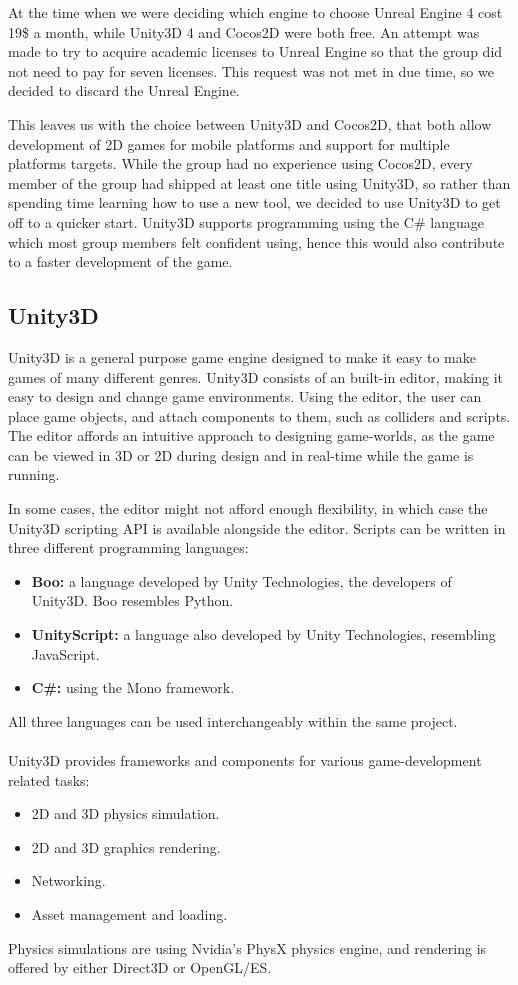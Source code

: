 At the time when we were deciding which engine to choose Unreal Engine 4 cost 19\$ a month\cite{unrealFree}, while Unity3D 4 and Cocos2D were both free. 
An attempt was made to try to acquire academic licenses to Unreal Engine so that the group did not need to pay for seven licenses. 
This request was not met in due time, so we decided to discard the Unreal Engine.

This leaves us with the choice between Unity3D and Cocos2D, that both allow development of 2D games for mobile platforms and support for multiple platforms targets.
While the group had no experience using Cocos2D, every member of the group had shipped at least one title using Unity3D, so rather than spending time learning how to use a new tool, we decided to use Unity3D to get off to a quicker start.
Unity3D supports programming using the C\# language which most group members felt confident using, hence this would also contribute to a faster development of the game.

\subsection{Unity3D}
Unity3D is a general purpose game engine designed to make it easy to make games
of many different genres. Unity3D consists of an built-in editor, making it
easy to design and change game environments. Using the editor, the user can
place game objects, and attach components to them, such as colliders and
scripts. The editor affords an intuitive approach to designing game-worlds, as
the game can be viewed in 3D or 2D during design and in real-time while the
game is running.

In some cases, the editor might not afford enough flexibility, in which case
the Unity3D scripting API is available alongside the editor.
Scripts can be written in three different programming languages:

\begin{itemize}
    \item \textbf{Boo:} a language developed by Unity Technologies, the
        developers of Unity3D. Boo resembles Python.
    \item \textbf{UnityScript:} a language also developed by Unity
        Technologies, resembling JavaScript.
    \item \textbf{C#:} using the Mono framework.
\end{itemize}

All three languages can be used interchangeably within the same project.
\\
\\
Unity3D provides frameworks and components for various game-development related
tasks:
\begin{itemize}
    \item 2D and 3D physics simulation.
    \item 2D and 3D graphics rendering.
    \item Networking.
    \item Asset management and loading.
\end{itemize}

Physics simulations are using Nvidia's PhysX physics engine, and rendering is
offered by either Direct3D or OpenGL/ES.

